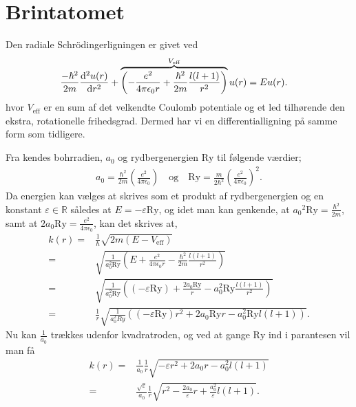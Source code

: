 \section{Brintatomet}
Den radiale Schrödingerligningen er givet ved \cite[s. 140]{griffiths}
%
\begin{align}
    \frac{-\hbar^{2}}{2m}\diff[2]{u(r)}{r} + \overbrace{\left( - \frac{e^{2}}{4\pi\epsilon_{0}r} + \frac{\hbar^{2}}{2m}\frac{l(l+1)}{r^{2}} \right)}^{V_{\text{eff}}} u(r) &  = Eu(r).
\end{align}
%
hvor $V_{\text{eff}}$ er en sum af det velkendte Coulomb potentiale og et led tilhørende den ekstra, rotationelle frihedsgrad. Dermed har vi en differentialligning på samme form som tidligere.

Fra \cite{griffiths} kendes bohrradien, $a_{0}$ og rydbergenergien $\mathrm{Ry}$ til følgende værdier;
\begin{align}
    a_{0} = \frac{\hbar^{2}}{2m} {\left(\frac{e^{2}}{4\pi\epsilon_{0}} \right) \quad \text{og} \quad \mathrm{Ry} = \frac{m}{2\hbar^{2}}\left(\frac{e^{2}}{4\pi\epsilon_0} \right)}^{2}.
    \label{eq:konstanter}
\end{align}
%
Da energien kan vælges at skrives som et produkt af rydbergenergien og en konstant $\varepsilon \in \mathbb{R}$ således at $E=-\varepsilon \mathrm{Ry}$, og idet man kan genkende, at ${a_{0}}^{2}\mathrm{Ry} = \frac{\hbar^{2}}{2m}$, samt at $2a_{0}\mathrm{Ry} = \frac{e^{2}}{4\pi\epsilon_{0}}$, kan det skrives at,
\begin{align}
    k(r) = & \frac{1}{\hbar} \sqrt{2m\left( E - V_{\text{eff}} \right)}\\
    = & \sqrt{\frac{1}{a_{0}^{2}\mathrm{\mathrm{Ry}}} \left( E + \frac{e^{2}}{4\pi\epsilon_{0}r} - \frac{\hbar^{2}}{2m}\frac{l(l+1)}{r^{2}} \right)}\\
    = & \sqrt{\frac{1}{a_{0}^{2}\mathrm{Ry}} \left( (-\varepsilon \mathrm{Ry}) + \frac{2a_{0}\mathrm{Ry}}{r} - a_{0}^{2}\mathrm{Ry}\frac{l(l+1)}{r^{2}} \right)}\\
    = & \frac{1}{r} \sqrt{\frac{1}{a_{0}^{2}{Ry}} \left( (-\varepsilon \mathrm{Ry})r^{2} + 2a_{0}\mathrm{Ry} r - a_{0}^{2}\mathrm{Ry} l(l+1) \right)}.
\end{align}
Nu kan $\frac{1}{a_0}$ trækkes udenfor kvadratroden, og ved at gange $\mathrm{Ry}$ ind i parantesen vil man få
\begin{align}
    k(r) = & \frac{1}{a_0} \frac{1}{r} \sqrt{-\varepsilon r^2 + 2a_0r - a_0^2l(l+1)} \\
    = & \frac{\sqrt{\varepsilon}}{a_0} \frac{1}{r} \sqrt{r^2 - \frac{2a_0}{\varepsilon}r + \frac{a_0^2}{\varepsilon}l(l+1)}.
\end{align}
